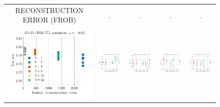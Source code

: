 \begin{figure}
\begin{tabular}{@{\hskip -0.0in}c@{\hskip -0.0in}c@{\hskip -0.0in}c@{\hskip -0.0in}c@{\hskip -0.0in}c@{\hskip -0.0in}}
		RECONSTRUCTION ERROR (FROB) & . & . & . & .\\
		\includegraphics[width=.2\linewidth]{figures/glove-wiki400k-am_sentiment_mr_test-acc_vs_embed-frob-error_linx.pdf} &
		\includegraphics[width=.2\linewidth]{figures/glove-wiki400k-am_sentiment_subj_test-acc_vs_embed-frob-error_linx.pdf} &
		\includegraphics[width=.2\linewidth]{figures/glove-wiki400k-am_sentiment_cr_test-acc_vs_embed-frob-error_linx.pdf} &
		\includegraphics[width=.2\linewidth]{figures/glove-wiki400k-am_sentiment_sst_test-acc_vs_embed-frob-error_linx.pdf} &
		\includegraphics[width=.2\linewidth]{figures/glove-wiki400k-am_sentiment_mpqa_test-acc_vs_embed-frob-error_linx.pdf} \\
		
		

\end{tabular}
\end{figure}
